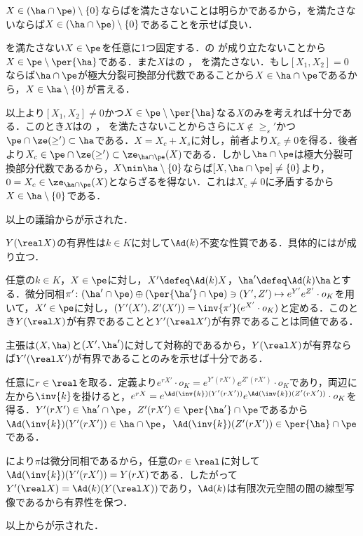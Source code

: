 \begin{npfwn}
\begin{enumerate}[label=\textbf{\arabic*.}]
    $X\in(\ha\cap\pe)\setminus\{0\} $ならばを満たさないことは明らかであるから，を満たさないならば$X\in(\ha\cap\pe)\setminus\{0\} $であることを示せば良い．

    
    
    を満たさない$X\in \pe$を任意に1つ固定する．の  が成り立たないことから$X\in \pe\setminus\per{\ha}$である．また$X$はの ， を満たさない．もし$[X_1, X_2] = 0 $ ならば$\ha\cap\pe$が極大分裂可換部分代数であることから$X\in\ha\cap \pe $であるから，$X\in \ha\setminus\{0\} $が言える．

    以上より$[X_1,X_2] \neq 0$かつ$X\in \pe\setminus\per{\ha}$なる$X$のみを考えれば十分である．このとき$X$はの ， を満たさないことからさらに$X\nin \ge_{s}' $かつ$\pe\cap\ze(\ge')\subset \ha $である．$X  = X_c + X_s $に対し，前者より$X_c\neq 0 $を得る．後者より$X_c\in \pe\cap\ze(\ge')\subset \ze_{\ha\cap\pe}(X) $である．しかし$\ha\cap \pe$は極大分裂可換部分代数であるから，$X\nin\ha\setminus\{0\} $ならば$[X, \ha\cap\pe ] \neq  \{0\}$より，$0 = X_c \in \ze_{\ha\cap\pe}(X) $とならざるを得ない．これは$X_c\neq 0 $に矛盾するから$X \in \ha\setminus\{0\}  $である．
    
    以上の議論からが示された．
  \end{enumerate}  
\end{npfwn}

$Y(\real X) $の有界性は$k\in K$に対して$\Ad(k) $不変な性質である．具体的にはが成り立つ．
\begin{lem}\label{lem:1101}
  任意の$k\in K$，$X\in \pe$に対し，$X'\defeq \Ad(k)X $，$\ha'\defeq \Ad(k)\ha $とする．微分同相$\pi'\colon (\ha'\cap \pe)\oplus (\per{\ha'}\cap \pe)\ni (Y',Z')\mapsto e^{Y'}e^{Z'}\cdot o_K  $を用いて，$X'\in \pe$に対し，$(Y'(X'), Z'(X')) = \inv{\pi'}(e^{X'}\cdot o_K) $と定める．このとき$Y(\real X)$が有界であることと$ Y'(\real X') $が有界であることは同値である．
\end{lem}

\begin{npfwn}
  主張は$(X,\ha) $と$(X',\ha')$に対して対称的であるから，$Y(\real X) $が有界ならば$Y'(\real X') $が有界であることのみを示せば十分である．

  任意に$r\in \real$を取る．定義より$e^{rX'}\cdot o_K = e^{Y'(r X')}e^{Z'(r X')}\cdot o_K  $であり，両辺に左から$\inv{k} $を掛けると，$e^{r X} = e^{\Ad(\inv{k})( Y'(r X'))}e^{\Ad(\inv{k})( Z'(r X'))}\cdot o_K  $を得る．$Y'(rX')\in \ha'\cap \pe $，$Z'(r X')\in \per{\ha'}\cap \pe $であるから$\Ad(\inv{k})(Y'(r X'))\in \ha\cap \pe $，$\Ad(\inv{k})(Z'(r X')) \in \per{\ha}\cap \pe $である．

  により$\pi$は微分同相であるから，任意の$r\in \real$に対して$\Ad(\inv{k})(Y'(r X')) = Y(rX)  $である．したがって$Y'(\real X) = \Ad(k)(Y(\real X))  $であり，$\Ad(k) $は有限次元空間の間の線型写像であるから有界性を保つ．

  以上からが示された．  
\end{npfwn}


